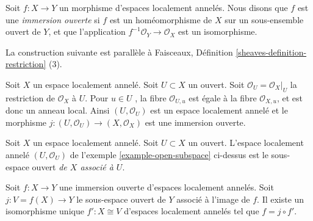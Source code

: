 \begin{definition}
\label{definition-immersion-locally-ringed-spaces}
Soit  $f : X \to Y$  un morphisme d'espaces localement annelés. Nous disons que
 $f$  est une  {\it  immersion ouverte}  si
 $f$  est un homéomorphisme de  $X$  sur un sous-ensemble ouvert de
 $Y$, et que l'application  $f^{-1}\mathcal{O}_Y \to \mathcal{O}_X$  est un isomorphisme.
\end{definition}

\noindent
La construction suivante est parallèle à Faisceaux, Définition  \ref{sheaves-definition-restriction}  (3).

\begin{example}
\label{example-open-subspace}
Soit  $X$  un espace localement annelé. Soit  $U \subset X$  un ouvert. Soit
 $\mathcal{O}_U = \mathcal{O}_X|_U$  la restriction de  $\mathcal{O}_X$  à  $U$. Pour  $u \in U$ , la
fibre  $\mathcal{O}_{U, u}$  est égale à la fibre  $\mathcal{O}_{X, u}$, et est donc un anneau local.
Ainsi  $(U, \mathcal{O}_U)$  est un espace localement annelé et le morphisme  $j : (U, \mathcal{O}_U) \to (X, \mathcal{O}_X)$ 
est une immersion ouverte.
\end{example}

\begin{definition}
\label{definition-open-subspace}
Soit  $X$  un espace localement annelé. Soit  $U \subset X$  un ouvert.
L'espace localement annelé  $(U, \mathcal{O}_U)$  de l'exemple  \ref{example-open-subspace}  ci-dessus est le
sous-espace ouvert  {\it  de  $X$  associé à
 $U$}.
\end{definition}

\begin{lemma}
\label{lemma-open-immersion}
Soit  $f : X \to Y$  une immersion ouverte d'espaces localement annelés. Soit
 $j : V = f(X) \to Y$  le sous-espace ouvert de  $Y$  associé à l'image de
 $f$. Il existe un isomorphisme unique  $f' : X \cong V$  d'espaces localement
annelés tel que  $f = j \circ f'$.
\end{lemma}

